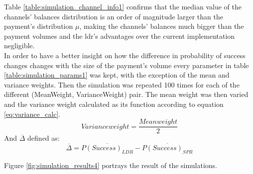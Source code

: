 \begin{table}[H]
\caption{Median channel balance and payment volume distribution parameters}
\label{table:simulation_channel_info1}
\end{table}

Table \ref{table:simulation_channel_info1} confirms that the median value of the channels' balances distribution is an order of magnitude larger than the payment's distribution $\mu$, making the channels' balances much bigger than the payment volumes and the \acrshort{ldr}'s advantages over the current implementation negligible. \\

In order to have a better insight on how the difference in probability of success changes changes with the size of the payment's volume every parameter in table \ref{table:simulation_params1} was kept, with the exception of the mean and variance weights. Then the simulation was repeated 100 times for each of the different (MeanWeight, VarianceWeight) pair.
The mean weight was then varied and the variance weight calculated as its function according to equation \ref{eq:variance_calc}.
\begin{equation}
    Variance weight = \frac{Mean weight}{2}
    \label{eq:variance_calc}
\end{equation}
And $\overline{\Delta}$ defined as:
\begin{equation}
    \overline{\Delta} = \overline{P(Success)_{LDR}} - \overline{P(Success)_{SPR}}
\end{equation}

Figure \ref{fig:simulation_results4} portrays the result of the simulations.


